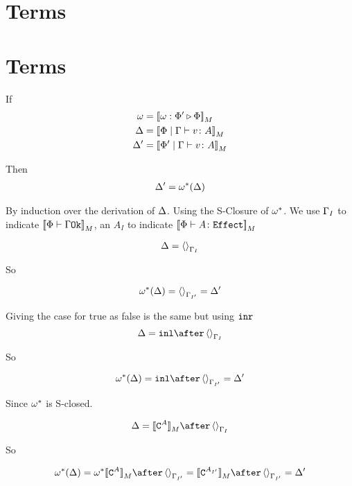 \documentclass{report}
\begin{document}
\section{Terms}


\section{Terms}
If 
\begin{align}
    \omega &= {\bf [\![}\omega : \Phi' \triangleright \Phi{\bf ]\!]}_M\\
    \Delta &= {\bf [\![}\Phi\mid\Gamma \vdash v \colon A{\bf ]\!]}_M\\
    \Delta' &= {\bf [\![}\Phi'\mid\Gamma \vdash v \colon A{\bf ]\!]}_M\\
\end{align}

Then \begin{eqnarray}
    \Delta' = \omega^*(\Delta)
\end{eqnarray}

\proof
By induction over the derivation of $\Delta$. Using the S-Closure of $\omega^*$. We use $\Gamma_I$ to indicate ${\bf [\![}\Phi\vdash \Gamma \texttt{Ok}{\bf ]\!]}_M$, an $A_I$ to indicate ${\bf [\![}\Phi \vdash A \colon \texttt{Effect}{\bf ]\!]}_M$


\begin{equation}
    \Delta = \left\langle\right\rangle_{\Gamma_I}
\end{equation}

So

\begin{equation}
    \omega^*(\Delta) = \left\langle\right\rangle_{\Gamma_{I'}} = \Delta'
\end{equation}

Giving the case for true as false is the same but using $\texttt{inr}$
\begin{equation}
    \D = \inl\after\term{\G_I}
\end{equation}

So

\begin{equation}
    \w\star(\D) = \inl\after \term{\G_{I'}} = \D'
\end{equation}

Since $\omega^*$ is S-closed.



\begin{equation}
    \D = \deno{\const{A}}\after\term{\G_I}
\end{equation}

So

\begin{equation}
    \w\star(\D) = \w\star\deno{\const{A}}\after \term{\G_{I'}}=\deno{\const{A_{I'}}}\after \term{\G_{I'}}  = \D'
\end{equation}
\end{document}
